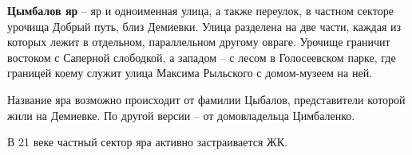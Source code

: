 \textbf{Цымбалов яр} – яр и одноименная улица, а также переулок, в частном секторе урочища Добрый путь, близ Демиевки. Улица разделена на две части, каждая из которых лежит в отдельном, параллельном другому овраге. Урочище граничит востоком с Саперной слободкой, а западом – с лесом в Голосеевском парке, где границей коему служит улица Максима Рыльского с домом-музеем на ней.

Название яра возможно происходит от фамилии Цыбалов, представители которой жили на Демиевке. По другой версии – от домовладельца  Цимбаленко.

В 21 веке частный сектор яра активно застраивается ЖК.

